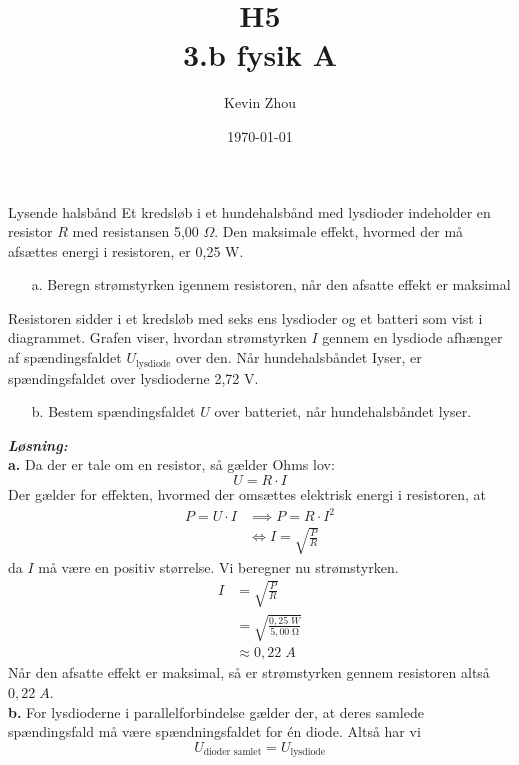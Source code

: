 \documentclass{report}
\title{H5\\
{\Large \textbf{3.b fysik A}}}
\author{Kevin Zhou}
\date{\today}
\newcommand{\sol}{\setlength{\parindent}{0cm}\textbf{\textit{Løsning:}}\setlength{\parindent}{1cm}}
\begin{document}
\maketitle
\begin{question}{Lysende halsbånd}{}
  Et kredsløb i et hundehalsbånd med lysdioder indeholder en resistor $R$ med resistansen 5,00 $\Omega$. Den maksimale effekt, hvormed der må afsættes energi i resistoren, er 0,25 W.
  \begin{itemize}
    \item[a.] Beregn strømstyrken igennem resistoren, når den afsatte effekt er maksimal
  \end{itemize}
Resistoren sidder i et kredsløb med seks ens lysdioder og et batteri som vist i diagrammet.
Grafen viser, hvordan strømstyrken $I$ gennem en lysdiode afhænger af spændingsfaldet $U_\mathrm{lysdiode}$ over den.
Når hundehalsbåndet Iyser, er spændingsfaldet over lysdioderne 2,72 V.
\begin{itemize}
  \item[b.] Bestem spændingsfaldet $U$ over batteriet, når hundehalsbåndet lyser.
\end{itemize}
\end{question}
\sol \\
\textbf{a.}
Da der er tale om en resistor, så gælder Ohms lov:
\[
U=R \cdot I
\] 
Der gælder for effekten, hvormed der omsættes elektrisk energi i resistoren, at
\begin{equation*}
\begin{split}
  P=U \cdot I &\implies P=R \cdot I^2 \\
  &\iff I=\sqrt{\frac{P}{R}} 
\end{split}
\end{equation*}
da $I$ må være en positiv størrelse.
Vi beregner nu strømstyrken.
\begin{equation*}
\begin{split}
  I&=\sqrt{\frac{P}{R}} \\
  &=\sqrt{\frac{0,25 \;\unit{W} }{5,00 \;\unit{\ohm} }} \\
  &\approx 0,22 \;\unit{A} 
\end{split}
\end{equation*}
Når den afsatte effekt er maksimal, så er strømstyrken gennem resistoren altså $0,22 \;\unit{A} $.\\[1ex]
\textbf{b.}
For lysdioderne i parallelforbindelse gælder der, at deres samlede spændingsfald må være spændningsfaldet for én diode.
Altså har vi 
\[
U_{\text{dioder samlet} }=U_{\text{lysdiode} }
\] 
\end{document}
